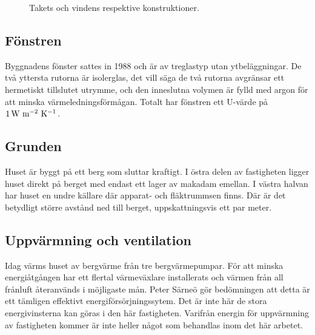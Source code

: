 \begin{figure}[hpbt]
\centering
{}
\caption{\label{fig:roof_attic} Takets och vindens respektive konstruktioner.}
\end{figure}


\subsection{Fönstren}

Byggnadens fönster sattes in 1988 och är av treglastyp utan ytbeläggningar. De två yttersta rutorna är isolerglas, det vill säga de två rutorna avgränsar ett hermetiskt tillslutet utrymme, och den inneslutna volymen är fylld med argon för att minska värmeledningsförmågan. Totalt har fönstren ett U-värde på $\unit[1]{W~m^{-2}~K^{-1}}$.

\subsection{Grunden}

Huset är byggt på ett berg som sluttar kraftigt. I östra delen av fastigheten ligger huset direkt på berget med endast ett lager av makadam emellan\cite{petersarneo}. I västra halvan har huset en undre källare där apparat- och fläktrummsen finns. Där är det betydligt större avstånd ned till berget, uppskattningsvis ett par meter. %

\subsection{Uppvärmning och ventilation}
Idag värms huset av bergvärme från tre bergvärmepumpar. För att minska energiåtgången har ett flertal värmeväxlare installerats och värmen från all frånluft återanvänds i möjligaste mån. Peter Särneö gör bedömningen att detta är ett tämligen effektivt energiförsörjningssytem. Det är inte här de stora energivinsterna kan göras i den här fastigheten. Varifrån energin för uppvärmning av fastigheten kommer är inte heller något som behandlas inom det här arbetet.
